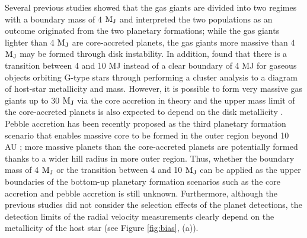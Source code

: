 \documentclass[twocolumn, dvipdfmx]{aastex62}
\begin{document}
\begin{CJK*}{UTF8}{min}
Several previous studies\citep{2007A&A...464..779R, 2017A&A...603A..30S} showed that the gas giants are divided into two regimes with a boundary mass of 4 $\rm M_J$ and interpreted the two populations as an outcome originated from the two planetary formations; while the gas giants lighter than 4 $\rm M_J$ are core-accreted planets, the gas giants more massive than 4 $\rm M_J$ may be formed through disk instability. In addition, \cite{2018ApJ...853...37S} found that there is a transition between 4 and 10 MJ instead of a clear boundary of 4 MJ for gaseous objects orbiting G-type stars through performing a cluster analysis to a diagram of host-star metallicity and mass. However, it is possible to form very massive gas giants up to 30 $\rm M_J$ via the core accretion in theory \citep[e.g.,][]{2007ApJ...667..557T, 2009A&A...501.1161M, 2016ApJ...823...48T} and the upper mass limit of the core-accreted planets is also expected to depend on the disk metallicity \citep{2012A&A...541A..97M}. Pebble accretion has been recently proposed as the third planetary formation scenario that enables massive core to be formed in the outer region beyond 10 AU \citep{2010A&A...520A..43O, 2012A&A...544A..32L}; more massive planets than the core-accreted planets are potentially formed thanks to  a wider hill radius in more outer region. Thus, whether the boundary mass of 4 $\rm M_J$ or the transition between 4 and 10 $\rm M_J$ can be applied as the upper boundaries of the bottom-up planetary formation scenarios such as the core accretion and pebble accretion is still unknown. Furthermore, although the previous studies did not consider the selection effects of the planet detections, the detection limits of the radial velocity measurements clearly depend on the metallicity of the host star (see Figure \ref{fig:bias}, (a)). 


\end{CJK*}
\end{document}
